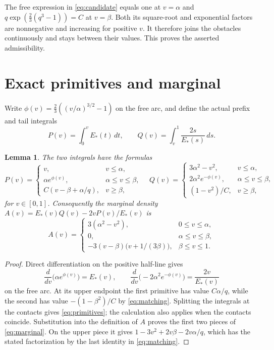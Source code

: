 \documentclass[11pt]{article}
\newtheorem{lemma}[theorem]{Lemma}
\begin{document}
The free expression in \eqref{eq:candidate} equals one at $v=\alpha$
and $q\exp(\frac23(q^3-1))=C$ at $v=\beta$. Both its square-root
and exponential factors are nonnegative and increasing for positive $v$.
It therefore joins the obstacles continuously and stays between their
values. This proves the asserted admissibility.

\section{Exact primitives and marginal}

Write $\phi(v)=\frac23((v/\alpha)^{3/2}-1)$ on the free arc, and define
the actual prefix and tail integrals
\[
 P(v)=\int_0^v E_*(t)\,dt,\qquad
 Q(v)=\int_v^1\frac{2s}{E_*(s)}\,ds.
\]
\begin{lemma}\label{lem:primitives}
The two integrals have the formulas
\begin{equation}\label{eq:primitives}
 P(v)=
 \begin{cases}
 v,&v\leq\alpha,\\
 \alpha e^{\phi(v)},&\alpha\leq v\leq\beta,\\
 C(v-\beta+\alpha/q),&v\geq\beta,
 \end{cases}
 \quad
 Q(v)=
 \begin{cases}
 3\alpha^2-v^2,&v\leq\alpha,\\
 2\alpha^2 e^{-\phi(v)},&\alpha\leq v\leq\beta,\\
 (1-v^2)/C,&v\geq\beta,
 \end{cases}
\end{equation}
for $v\in[0,1]$. Consequently the marginal density
$A(v)=E_*(v)Q(v)-2vP(v)/E_*(v)$ is
\begin{equation}\label{eq:marginal}
 A(v)=
 \begin{cases}
 3(\alpha^2-v^2),&0\leq v\leq\alpha,\\
 0,&\alpha\leq v\leq\beta,\\
 -3(v-\beta)\bigl(v+1/(3\beta)\bigr),&\beta\leq v\leq1.
 \end{cases}
\end{equation}
\end{lemma}

\begin{proof}
Direct differentiation on the positive half-line gives
\[
 \frac{d}{dv}\bigl(\alpha e^{\phi(v)}\bigr)=E_*(v),\qquad
 \frac{d}{dv}\bigl(-2\alpha^2 e^{-\phi(v)}\bigr)
 =\frac{2v}{E_*(v)}
\]
on the free arc. At its upper endpoint the first primitive has value
$C\alpha/q$, while the second has value $-(1-\beta^2)/C$ by
\eqref{eq:matching}. Splitting the integrals at the contacts gives
\eqref{eq:primitives}; the calculation also applies when the contacts
coincide. Substitution into the definition of $A$ proves the first two
pieces of \eqref{eq:marginal}. On the upper piece it gives
$1-3v^2+2v\beta-2v\alpha/q$, which has the stated factorization by
the last identity in \eqref{eq:matching}.
\end{proof}
\end{document}
